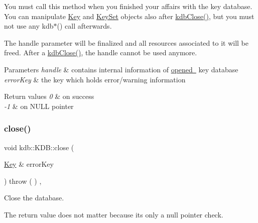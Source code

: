 You must call this method when you finished your affairs with the key database. You can manipulate \mbox{\hyperlink{classkdb_1_1Key}{Key}} and \mbox{\hyperlink{classkdb_1_1KeySet}{Key\+Set}} objects also after \mbox{\hyperlink{group__kdb_gadb54dc9fda17ee07deb9444df745c96f}{kdb\+Close()}}, but you must not use any kdb$\ast$() call afterwards.

The {\ttfamily handle} parameter will be finalized and all resources associated to it will be freed. After a \mbox{\hyperlink{group__kdb_gadb54dc9fda17ee07deb9444df745c96f}{kdb\+Close()}}, the {\ttfamily handle} cannot be used anymore.


\begin{DoxyParams}{Parameters}
{\em handle} & contains internal information of \mbox{\hyperlink{group__kdb_ga6808defe5870f328dd17910aacbdc6ca}{opened }} key database \\
\hline
{\em error\+Key} & the key which holds error/warning information \\
\hline
\end{DoxyParams}

\begin{DoxyRetVals}{Return values}
{\em 0} & on success \\
\hline
{\em -\/1} & on N\+U\+LL pointer \\
\hline
\end{DoxyRetVals}
\mbox{\label{classkdb_1_1KDB_aa027a8f798a2cfee11ff712eb204c35d}} 
\subsubsection{\texorpdfstring{close()}{close()}\hspace{0.1cm}{\footnotesize\ttfamily [2/2]}}
{\footnotesize\ttfamily void kdb\+::\+K\+D\+B\+::close (\begin{DoxyParamCaption}\item[{\mbox{\hyperlink{classkdb_1_1Key}{Key}} \&}]{error\+Key }\end{DoxyParamCaption}) throw ( ) \hspace{0.3cm}{\ttfamily [inline]}, {\ttfamily [virtual]}}



Close the database. 

The return value does not matter because its only a null pointer check.


